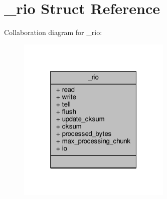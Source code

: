 \hypertarget{struct__rio}{}\section{\+\_\+rio Struct Reference}
\label{struct__rio}


Collaboration diagram for \+\_\+rio\+:\nopagebreak
\begin{figure}[H]
\begin{center}
\leavevmode
\includegraphics[width=208pt]{struct__rio__coll__graph}
\end{center}
\end{figure}
